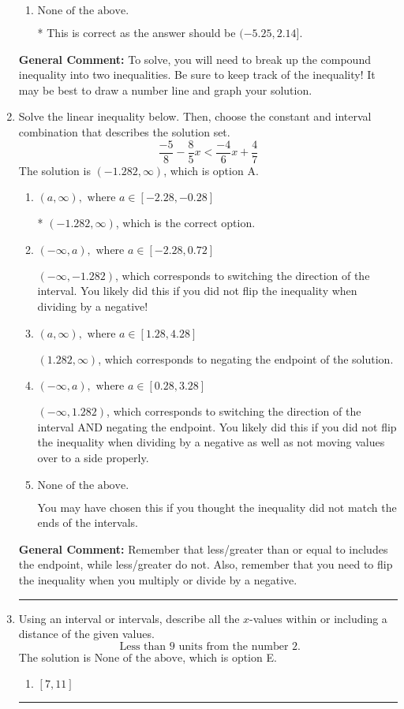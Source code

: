 \documentclass{extbook}[14pt]
\newcommand{\litem}[1]{\item #1

\rule{\textwidth}{0.4pt}}
\begin{document}
\begin{enumerate}
{\begin{enumerate}[label=\Alph*.]
$(5.25, -2.14]$, which is the correct interval but negatives of the actual endpoints.
\item \( \text{None of the above.} \)

* This is correct as the answer should be $(-5.25, 2.14]$.
\end{enumerate}

\textbf{General Comment:} To solve, you will need to break up the compound inequality into two inequalities. Be sure to keep track of the inequality! It may be best to draw a number line and graph your solution.
}
\litem{
Solve the linear inequality below. Then, choose the constant and interval combination that describes the solution set.
\[ \frac{-5}{8} - \frac{8}{5} x < \frac{-4}{6} x + \frac{4}{7} \]The solution is \( (-1.282, \infty) \), which is option A.\begin{enumerate}[label=\Alph*.]
\item \( (a, \infty), \text{ where } a \in [-2.28, -0.28] \)

* $(-1.282, \infty)$, which is the correct option.
\item \( (-\infty, a), \text{ where } a \in [-2.28, 0.72] \)

 $(-\infty, -1.282)$, which corresponds to switching the direction of the interval. You likely did this if you did not flip the inequality when dividing by a negative!
\item \( (a, \infty), \text{ where } a \in [1.28, 4.28] \)

 $(1.282, \infty)$, which corresponds to negating the endpoint of the solution.
\item \( (-\infty, a), \text{ where } a \in [0.28, 3.28] \)

 $(-\infty, 1.282)$, which corresponds to switching the direction of the interval AND negating the endpoint. You likely did this if you did not flip the inequality when dividing by a negative as well as not moving values over to a side properly.
\item \( \text{None of the above}. \)

You may have chosen this if you thought the inequality did not match the ends of the intervals.
\end{enumerate}

\textbf{General Comment:} Remember that less/greater than or equal to includes the endpoint, while less/greater do not. Also, remember that you need to flip the inequality when you multiply or divide by a negative.
}
\litem{
Using an interval or intervals, describe all the $x$-values within or including a distance of the given values.
\[ \text{ Less than } 9 \text{ units from the number } 2. \]The solution is \( \text{None of the above} \), which is option E.\begin{enumerate}[label=\Alph*.]
\item \( [7, 11] \)


\end{enumerate}}
\end{enumerate}
\end{document}

